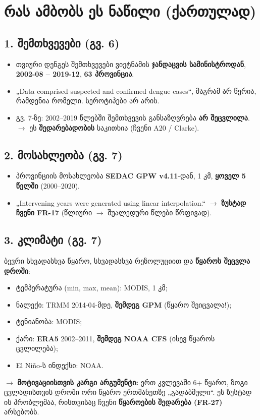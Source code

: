 \documentclass[11pt,a4paper]{article}
\begin{document}
\section*{რას ამბობს ეს ნაწილი (ქართულად)}

\subsection*{1. შემთხვევები (გვ. 6)}
\begin{itemize}[nosep]
\item თვიური დენგეს შემთხვევები ვიეტნამის \textbf{ჯანდაცვის სამინისტროდან}, \textbf{2002-08 – 2019-12}, \textbf{63 პროვინცია}.
\item „Data comprised suspected and confirmed dengue cases“, მაგრამ არ წერია, რამდენია რომელი. სეროტიპები არ არის.
\item გვ. 7-ზე: 2002–2019 წლებში შემთხვევის განსაზღვრება \textbf{არ შეცვლილა}. $\rightarrow$ ეს \textbf{შედარებადობის} საკითხია (ჩვენი A20 / Clarke).
\end{itemize}

\subsection*{2. მოსახლეობა (გვ. 7)}
\begin{itemize}[nosep]
\item პროვინციის მოსახლეობა \textbf{SEDAC GPW v4.11}-დან, 1 კმ, \textbf{ყოველ 5 წელში} (2000–2020).
\item „Intervening years were generated using linear interpolation.“ $\rightarrow$ \textbf{ზუსტად ჩვენი FR-17} (წლიური $\rightarrow$ შუალედური წლები წრფივად).
\end{itemize}

\subsection*{3. კლიმატი (გვ. 7)}
ბევრი სხვადასხვა წყარო, სხვადასხვა რეზოლუციით და \textbf{წყაროს შეცვლა დროში}:
\begin{itemize}[nosep]
\item ტემპერატურა (min, max, mean): MODIS, 1 კმ;
\item ნალექი: TRMM 2014-04-მდე, \textbf{შემდეგ GPM} (წყარო შეიცვალა!);
\item ტენიანობა: MODIS;
\item ქარი: \textbf{ERA5} 2002–2011, \textbf{შემდეგ NOAA CFS} (ისევ წყაროს ცვლილება);
\item El Niño-ს ინდექსი: NOAA.
\end{itemize}
$\rightarrow$ \textbf{მოტივაციისთვის კარგი არგუმენტი:} ერთ კვლევაში 6+ წყარო, ზოგი ცვლადისთვის დროში ორი წყარო ერთმანეთზე „გადაბმული“. ეს ზუსტად ის პრობლემაა, რისთვისაც ჩვენი \textbf{წყაროების შედარება (FR-27)} არსებობს.
\end{document}
